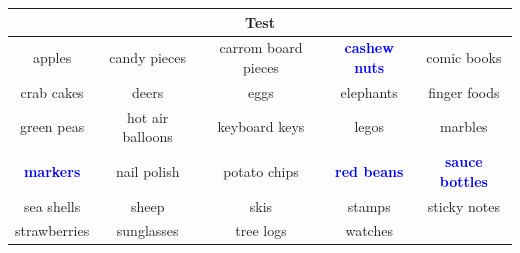 \begin{tabular}{ccccc}
\midrule
\multicolumn{5}{c}{Test} \\
\midrule
apples&candy pieces&carrom board pieces&\textbf{\textcolor{blue}{cashew nuts}}&comic books\\
crab cakes&deers&eggs&elephants&finger foods\\
green peas&hot air balloons&keyboard keys&legos&marbles\\
\textbf{\textcolor{blue}{markers}}&nail polish&potato chips&\textbf{\textcolor{blue}{red beans}}&\textbf{\textcolor{blue}{sauce bottles}}\\
sea shells&sheep&skis&stamps&sticky notes\\
strawberries&sunglasses&tree logs&watches\\

\bottomrule
\end{tabular}